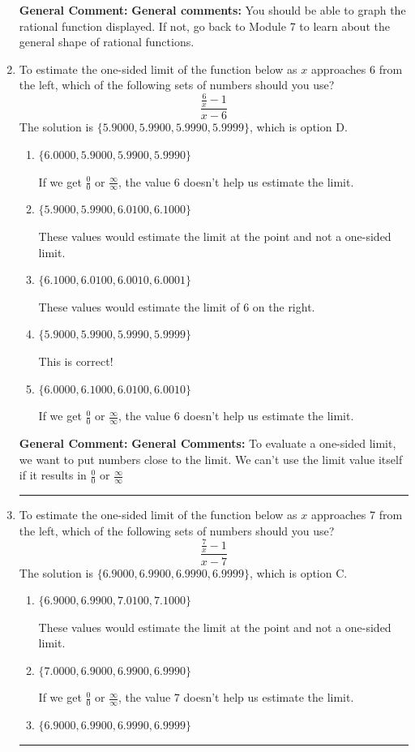 \documentclass{extbook}[14pt]
\newcommand{\litem}[1]{\item #1

\rule{\textwidth}{0.4pt}}
\begin{document}
\begin{enumerate}
{\textbf{General Comment:} \textbf{General comments:} You should be able to graph the rational function displayed. If not, go back to Module 7 to learn about the general shape of rational functions.
}
\litem{
To estimate the one-sided limit of the function below as $x$ approaches 6 from the left, which of the following sets of numbers should you use?
\[ \frac{\frac{6}{x} - 1}{x - 6} \]The solution is \( \{ 5.9000, 5.9900, 5.9990, 5.9999 \} \), which is option D.\begin{enumerate}[label=\Alph*.]
\item \( \{ 6.0000, 5.9000, 5.9900, 5.9990 \} \)

If we get $\frac{0}{0}$ or $\frac{\infty}{\infty}$, the value 6 doesn't help us estimate the limit.
\item \( \{ 5.9000, 5.9900, 6.0100, 6.1000 \} \)

These values would estimate the limit at the point and not a one-sided limit.
\item \( \{ 6.1000, 6.0100, 6.0010, 6.0001 \} \)

These values would estimate the limit of 6 on the right.
\item \( \{ 5.9000, 5.9900, 5.9990, 5.9999 \} \)

This is correct!
\item \( \{ 6.0000, 6.1000, 6.0100, 6.0010 \} \)

If we get $\frac{0}{0}$ or $\frac{\infty}{\infty}$, the value 6 doesn't help us estimate the limit.
\end{enumerate}

\textbf{General Comment:} \textbf{General Comments:} To evaluate a one-sided limit, we want to put numbers close to the limit. We can't use the limit value itself if it results in $\frac{0}{0}$ or $\frac{\infty}{\infty}$
}
\litem{
To estimate the one-sided limit of the function below as $x$ approaches 7 from the left, which of the following sets of numbers should you use?
\[ \frac{\frac{7}{x} - 1}{x - 7} \]The solution is \( \{ 6.9000, 6.9900, 6.9990, 6.9999 \} \), which is option C.\begin{enumerate}[label=\Alph*.]
\item \( \{ 6.9000, 6.9900, 7.0100, 7.1000 \} \)

These values would estimate the limit at the point and not a one-sided limit.
\item \( \{ 7.0000, 6.9000, 6.9900, 6.9990 \} \)

If we get $\frac{0}{0}$ or $\frac{\infty}{\infty}$, the value 7 doesn't help us estimate the limit.
\item \( \{ 6.9000, 6.9900, 6.9990, 6.9999 \} \)


\end{enumerate}}
\end{enumerate}
\end{document}
